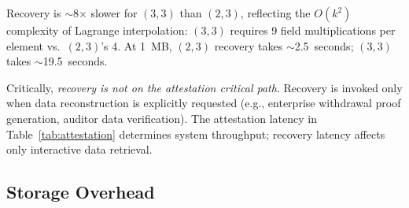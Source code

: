 \begin{table}[htbp]
\centering
\caption{Data Recovery Latency by Configuration}
\label{tab:recovery}
\end{table}

Recovery is $\sim$8$\times$ slower for $(3,3)$ than $(2,3)$, reflecting the
$O(k^2)$ complexity of Lagrange interpolation: $(3,3)$ requires 9 field
multiplications per element vs.\ $(2,3)$'s 4. At 1~MB, $(2,3)$ recovery
takes $\sim$2.5~seconds; $(3,3)$ takes $\sim$19.5~seconds.

Critically, \emph{recovery is not on the attestation critical path}. Recovery
is invoked only when data reconstruction is explicitly requested (e.g.,
enterprise withdrawal proof generation, auditor data verification). The
attestation latency in Table~\ref{tab:attestation} determines system
throughput; recovery latency affects only interactive data retrieval.

\subsection{Storage Overhead}

\begin{table}[htbp]
\centering
\caption{Storage Overhead (3-Node Committee)}
\label{tab:storage}
\end{table}

